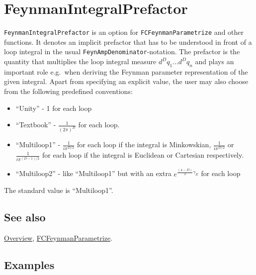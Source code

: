 \documentclass[../FeynCalcManual.tex]{subfiles}
\begin{document}
\hypertarget{feynmanintegralprefactor}{%
\section{FeynmanIntegralPrefactor}\label{feynmanintegralprefactor}}

\texttt{FeynmanIntegralPrefactor} is an option for
\texttt{FCFeynmanParametrize} and other functions. It denotes an
implicit prefactor that has to be understood in front of a loop integral
in the usual \texttt{FeynAmpDenominator}-notation. The prefactor is the
quantity that multiplies the loop integral measure
\(d^D q_1 \ldots d^D q_n\) and plays an important role e.g.~when
deriving the Feynman parameter representation of the given integral.
Apart from specifying an explicit value, the user may also choose from
the following predefined conventions:

\begin{itemize}
\tightlist
\item
  ``Unity'' - 1 for each loop
\item
  ``Textbook'' - \(\frac{1}{(2\pi)^D}\) for each loop.
\item
  ``Multiloop1'' - \(\frac{1}{i \pi^{D/2}}\) for each loop if the
  integral is Minkowskian, \(\frac{1}{i \pi^{D/2}}\) or
  \(\frac{1}{i \pi^{(D-1)/2}}\) for each loop if the integral is
  Euclidean or Cartesian respectively.
\item
  ``Multiloop2'' - like ``Multiloop1'' but with an extra
  \(e^{\frac{(4-D)}{2} \gamma_E}\) for each loop
\end{itemize}

The standard value is ``Multiloop1''.

\subsection{See also}

\hyperlink{toc}{Overview},
\hyperlink{fcfeynmanparametrize}{FCFeynmanParametrize}.

\subsection{Examples}

\begin{Shaded}
\begin{Highlighting}[]
\OperatorTok{[}\OperatorTok{[}\OperatorTok{,}  \SpecialCharTok{{-}} \OperatorTok{],} \OperatorTok{\{}\OperatorTok{\},}  \OtherTok{{-}\textgreater{}} \OperatorTok{,}\OtherTok{{-}\textgreater{}} \OperatorTok{\{} \OtherTok{{-}\textgreater{}}  \SpecialCharTok{{-}} \OperatorTok{\}]}
\end{Highlighting}
\end{Shaded}
\end{document}
